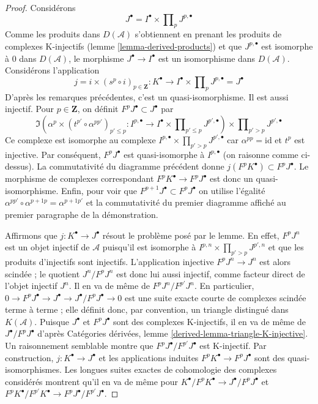 \begin{proof}
\medskip\noindent
Considérons
$$
J^\bullet = I^\bullet \times \prod\nolimits_p J^{p, \bullet}
$$
Comme les produits dans $D(\mathcal{A})$ s'obtiennent en prenant
les produits de complexes K-injectifs
(lemme \ref{lemma-derived-products}) et que $J^{p, \bullet}$
est isomorphe à $0$ dans $D(\mathcal{A})$, le morphisme
$J^\bullet \to I^\bullet$ est un isomorphisme dans $D(\mathcal{A})$.
Considérons l'application
$$
j = i \times (s^p \circ i)_{p \in \mathbf{Z}} :
K^\bullet
\longrightarrow
I^\bullet \times \prod\nolimits_p J^{p, \bullet} = J^\bullet
$$
D'après les remarques précédentes, c'est un quasi-isomorphisme. Il est aussi
injectif. Pour $p \in \mathbf{Z}$, on définit $F^pJ^\bullet \subset J^\bullet$ par
$$
\Im\left(
\alpha^p \times (t^{p'} \circ \alpha^{pp'})_{p' \leq p} :
I^{p, \bullet}
\to
I^\bullet \times \prod\nolimits_{p' \leq p} J^{p', \bullet}
\right)
\times \prod\nolimits_{p' > p} J^{p', \bullet}
$$
Ce complexe est isomorphe au complexe
$I^{p, \bullet} \times \prod_{p' > p} J^{p', \bullet}$
car $\alpha^{pp} = \text{id}$ et $t^p$ est injective.
Par conséquent, $F^pJ^\bullet$ est quasi-isomorphe à $I^{p, \bullet}$
(on raisonne comme ci-dessus). La commutativité du diagramme précédent donne
$j(F^pK^\bullet) \subset F^pJ^\bullet$. Le morphisme de complexes correspondant
$F^pK^\bullet \to F^pJ^\bullet$ est donc un quasi-isomorphisme.
Enfin, pour voir que
$F^{p + 1}J^\bullet \subset F^pJ^\bullet$
on utilise l'égalité $\alpha^{pp'} \circ \alpha^{p + 1p} = \alpha^{p + 1p'}$
et la commutativité du premier diagramme affiché au premier paragraphe
de la démonstration.

\medskip\noindent
Affirmons que $j : K^\bullet \to J^\bullet$ résout le problème posé par le
lemme. En effet, $F^pJ^n$ est un objet injectif de $\mathcal{A}$ puisqu'il est
isomorphe à $I^{p, n} \times \prod_{p' > p} J^{p', n}$ et que les produits
d'injectifs sont injectifs. L'application injective $F^pJ^n \to J^n$ est alors
scindée ; le quotient $J^n/F^pJ^n$ est donc lui aussi injectif, comme facteur
direct de l'objet injectif $J^n$. Il en va de même de
$F^pJ^n/F^{p'}J^n$. En particulier,
$0 \to F^pJ^\bullet \to J^\bullet \to J^\bullet/F^pJ^\bullet \to 0$
est une suite exacte courte de complexes scindée terme à terme ; elle définit
donc, par convention, un triangle distingué dans $K(\mathcal{A})$.
Puisque $J^\bullet$ et $F^pJ^\bullet$ sont des complexes K-injectifs, il en va
de même de $J^\bullet/F^pJ^\bullet$ d'après Catégories dérivées, lemme
\ref{derived-lemma-triangle-K-injective}. Un raisonnement semblable montre que
$F^pJ^\bullet/F^{p'}J^\bullet$ est K-injectif. Par construction,
$j : K^\bullet \to J^\bullet$ et les applications induites
$F^pK^\bullet \to F^pJ^\bullet$ sont des quasi-isomorphismes. Les longues
suites exactes de cohomologie des complexes considérés montrent qu'il en va
de même pour
$K^\bullet/F^pK^\bullet \to J^\bullet/F^pJ^\bullet$ et
$F^pK^\bullet/F^{p'}K^\bullet \to F^pJ^\bullet/F^{p'}J^\bullet$.
\end{proof}

